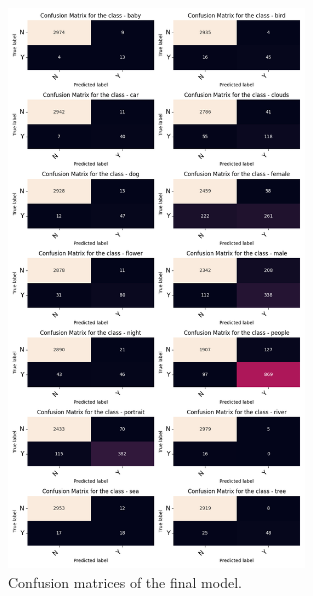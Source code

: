 \documentclass[a4paper, 12pt]{article}
\begin{document}
\begin{figure}
    \centering
    \includegraphics[width=0.7\textwidth]{img/confusion_matrix_test_dataset.png}
    \caption{Confusion matrices of the final model.}
    \label{fig:confusion_matrix}
\end{figure}

\renewcommand\bibname{References}


\end{document}
